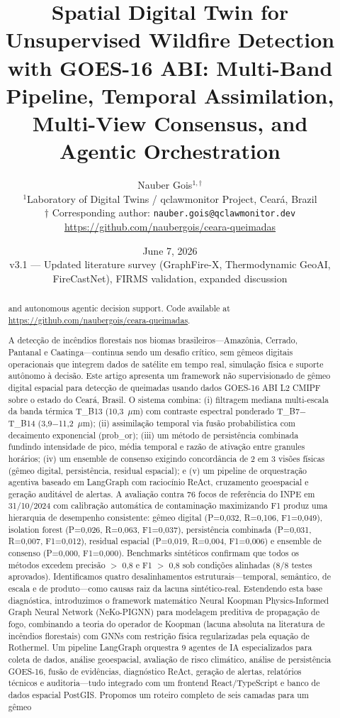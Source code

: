 \documentclass[11pt,twocolumn,a4paper]{article}
\title{\Large\textbf{Spatial Digital Twin for Unsupervised Wildfire Detection\\[4pt]
with GOES-16 ABI: Multi-Band Pipeline, Temporal Assimilation,\\[4pt]
Multi-View Consensus, and Agentic Orchestration}}
\author{Nauber Gois$^{1,\dagger}$ \\
\small $^{1}$Laboratory of Digital Twins / qclawmonitor Project, Cear\'{a}, Brazil \\
\small $\dagger$ Corresponding author: \texttt{nauber.gois@qclawmonitor.dev} \\
\small \url{https://github.com/naubergois/ceara-queimadas}}
\date{June 7, 2026\vspace{4pt}\\
\small v3.1 --- Updated literature survey (GraphFire-X, Thermodynamic GeoAI,
FireCastNet), FIRMS validation, expanded discussion}
\begin{document}
\maketitle

\begin{abstract}

and autonomous agentic decision support.
Code available at \url{https://github.com/naubergois/ceara-queimadas}.
\end{abstract}

\begin{otherlanguage}{portuguese}
\begin{abstract}
A detecção de incêndios florestais nos biomas brasileiros---Amazônia, Cerrado, Pantanal e Caatinga---continua sendo um desafio crítico, sem gêmeos digitais operacionais que integrem dados de satélite em tempo real, simulação física e suporte autônomo à decisão. Este artigo apresenta um framework não supervisionado de gêmeo digital espacial para detecção de queimadas usando dados GOES-16 ABI L2 CMIPF sobre o estado do Ceará, Brasil. O sistema combina: (i) filtragem mediana multi-escala da banda térmica T\_B13 (10,3~$\mu$m) com contraste espectral ponderado T\_B7$-$T\_B14 (3,9$-$11,2~$\mu$m); (ii) assimilação temporal via fusão probabilística com decaimento exponencial (prob\_or); (iii) um método de persistência combinada fundindo intensidade de pico, média temporal e razão de ativação entre granules horários; (iv) um ensemble de consenso exigindo concordância de 2 em 3 visões físicas (gêmeo digital, persistência, residual espacial); e (v) um pipeline de orquestração agentiva baseado em LangGraph com raciocínio ReAct, cruzamento geoespacial e geração auditável de alertas. A avaliação contra 76 focos de referência do INPE em 31/10/2024 com calibração automática de contaminação maximizando F1 produz uma hierarquia de desempenho consistente: gêmeo digital (P=0,032, R=0,106, F1=0,049), isolation forest (P=0,026, R=0,063, F1=0,037), persistência combinada (P=0,031, R=0,007, F1=0,012), residual espacial (P=0,019, R=0,004, F1=0,006) e ensemble de consenso (P=0,000, F1=0,000). Benchmarks sintéticos confirmam que todos os métodos excedem precisão $>$ 0,8 e F1 $>$ 0,8 sob condições alinhadas (8/8 testes aprovados). Identificamos quatro desalinhamentos estruturais---temporal, semântico, de escala e de produto---como causas raiz da lacuna sintético-real. Estendendo esta base diagnóstica, introduzimos o framework matemático Neural Koopman Physics-Informed Graph Neural Network (NeKo-PIGNN) para modelagem preditiva de propagação de fogo, combinando a teoria do operador de Koopman (lacuna absoluta na literatura de incêndios florestais) com GNNs com restrição física regularizadas pela equação de Rothermel. Um pipeline LangGraph orquestra 9 agentes de IA especializados para coleta de dados, análise geoespacial, avaliação de risco climático, análise de persistência GOES-16, fusão de evidências, diagnóstico ReAct, geração de alertas, relatórios técnicos e auditoria---tudo integrado com um frontend React/TypeScript e banco de dados espacial PostGIS. Propomos um roteiro completo de seis camadas para um gêmeo 
\end{abstract}
\end{otherlanguage}
\end{document}
